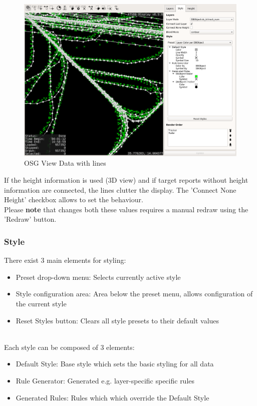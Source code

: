 \begin{figure}[H]
    \hspace*{-2.5cm}
    \includegraphics[width=19cm,frame]{../screenshots/osgview_connect_lines.png}
  \caption{OSG View Data with lines}
\end{figure}

If the height information is used (3D view) and if target reports without height information are connected, the lines clutter the display. The 'Connect None Height' checkbox allows to set the behaviour. \\

Please \textbf{note} that changes both these values requires a manual redraw using the 'Redraw' button.

\subsubsection{Style}
\label{sec:style}

There exist 3 main elements for styling:
\begin{itemize}
 \item Preset drop-down menu: Selects currently active style
 \item Style configuration area: Area below the preset menu, allows configuration of the current style
 \item Reset Styles button: Clears all style presets to their default values
\end{itemize}
\  \\

Each style can be composed of 3 elements:
\begin{itemize}
 \item Default Style: Base style which sets the basic styling for all data
 \item Rule Generator: Generated e.g. layer-specific specific rules
 \item Generated Rules: Rules which which override the Default Style
\end{itemize}
\  \\

